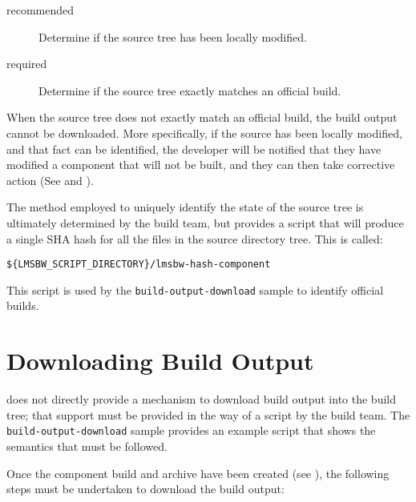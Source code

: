   \begin{description}
  \item[recommended] Determine if the source tree has been
    locally modified.

  \item[required] Determine if the source tree exactly matches an
    official build.
  \end{description}

When the source tree does not exactly match an official build, the
build output cannot be downloaded.  More specifically, if the source
has been locally modified, and that fact can be identified, the
developer will be notified that they have modified a component that
will not be built, and they can then take corrective action (See
 and
).

The method employed to uniquely identify the state of the source tree
is ultimately determined by the build team, but \lmsbw provides a
script that will produce a single SHA hash for all the files in the
source directory tree.  This is called:

\begin{verbatim}
${LMSBW_SCRIPT_DIRECTORY}/lmsbw-hash-component
\end{verbatim}

This script is used by the \texttt{build-output-download} sample to
identify official builds.

\section{Downloading Build Output}
\label{tips:build-output-download-script}

\lmsbw does not directly provide a mechanism to download build output
into the build tree; that support must be provided in the way of a
script by the build team.  The \texttt{build-output-download} sample
provides an example script that shows the semantics that must be
followed.

Once the component build and archive have been created (see
), the following steps must be
undertaken to download the build output:

